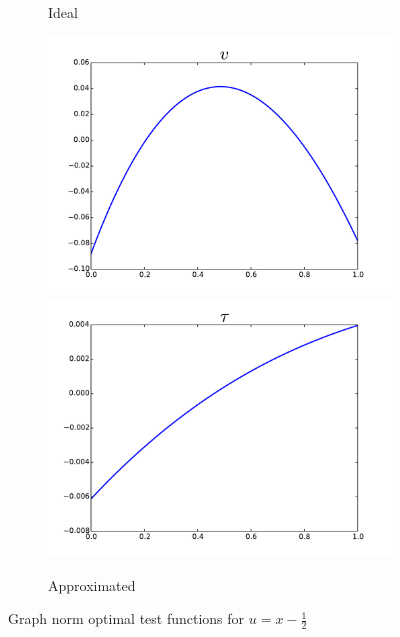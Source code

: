 \documentclass{article}
\begin{document}
\begin{figure}[ht]
\begin{subfigure}[t]{0.4\textwidth}
\caption{Ideal}
\label{fig:idealGraph}
\end{subfigure}
\begin{subfigure}[t]{0.4\textwidth}
\centering
\includegraphics[width=\textwidth]{OptimalTestFunctions/GraphApprox3_v}\\
\includegraphics[width=\textwidth]{OptimalTestFunctions/GraphApprox3_tau}\\
\caption{Approximated}
\label{fig:approxGraph}
\end{subfigure}
\caption{Graph norm optimal test functions for $u=x-\frac{1}{2}$}
\label{fig:optimalGraph}
\end{figure}
\end{document}
